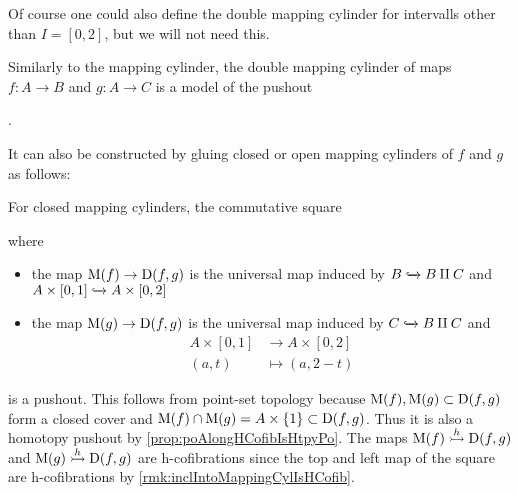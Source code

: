 \begin{remark}\label{rmk:doubleMappingCylinderAlt}
    Of course one could also define the double mapping cylinder for intervalls other than $I=[0,2]$, but we will not need this.

    Similarly to the mapping cylinder, the double mapping cylinder of maps $f\colon A\to B$ and $g\colon A\to C$ is a model of the pushout
    \begin{center}
        \;.
    \end{center}
    It can also be constructed by gluing closed or open mapping cylinders of $f$ and $g$ as follows:

    For closed mapping cylinders, the commutative square
    \begin{center}
    \end{center}
    where 
    \begin{itemize}
        \item the map $\operatorname{M}(f)\to\operatorname{D}(f,g)$ is the universal map induced by $B\xhookrightarrow{}B\amalg C$ and $A\times[0,1]\xhookrightarrow{}A\times[0,2]$
        \item the map $\operatorname{M}(g)\to\operatorname{D}(f,g)$ is the universal map induced by $C\xhookrightarrow{}B\amalg C$ and 
        \begin{align*}
            A\times[0,1]&\to A\times[0,2]\\
            (a,t)&\mapsto(a,2-t)
        \end{align*}
    \end{itemize}
    is a pushout. 
    This follows from point-set topology because $\operatorname{M}(f),\operatorname{M}(g)\subset\operatorname{D}(f,g)$ form a closed cover and $\operatorname{M}(f)\cap\operatorname{M}(g)=A\times\left\lbrace1\right\rbrace\subset\operatorname{D}(f,g)$.
    Thus it is also a homotopy pushout by \cref{prop:poAlongHCofibIsHtpyPo}. 
    The maps $\M(f)\xtailrightarrow{h}\D(f,g)$ and $\M(g)\xtailrightarrow{h}\D(f,g)$ are h-cofibrations since the top and left map of the square are h-cofibrations by \cref{rmk:inclIntoMappingCylIsHCofib}.


\end{remark}
